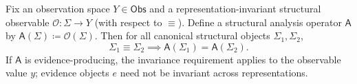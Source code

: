 \begin{theorem}
\label{thm:representation-invariance}
Fix an observation space $Y\in\mathsf{Obs}$ and a representation-invariant structural observable $\mathcal O: \Sigma\to Y$ (with respect to $\equiv$). Define a structural analysis operator $\mathsf A$ by $\mathsf A(\Sigma)\coloneqq \mathcal O(\Sigma)$. Then for all canonical structural objects $\Sigma_1,\Sigma_2$,
\[
\Sigma_1\equiv \Sigma_2 \implies \mathsf A(\Sigma_1)=\mathsf A(\Sigma_2).
\]
If $\mathsf A$ is evidence-producing, the invariance requirement applies to the observable value $y$; evidence objects $e$ need not be invariant across representations.
\end{theorem}

%
%
%
%
%


